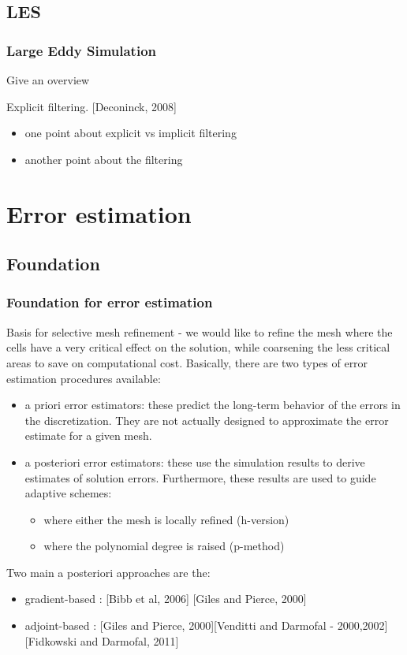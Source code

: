 \documentclass{beamer}
\begin{document}
\subsection{LES}
\begin{frame}
\frametitle{Large Eddy Simulation}
\scriptsize

Give an overview

Explicit filtering. [Deconinck, 2008]
\begin{itemize}
\item one point about explicit vs implicit filtering
\item another point about the filtering
\end{itemize}
\end{frame}


\section[Error estimates]{Error estimation}

\subsection{Foundation}
\begin{frame}
\frametitle{Foundation for error estimation}
\scriptsize
Basis for selective mesh refinement - we would like to refine the mesh where the cells have a very critical effect on the solution, while coarsening the less critical areas to save on computational cost.\newline 
Basically, there are two types of error estimation procedures available:
\begin{itemize}
\item a priori error estimators:  these predict the long-term behavior of the errors in the discretization. They are not actually designed to approximate the error estimate for a given mesh. 
\item a posteriori error estimators: these use the simulation results to derive estimates of solution errors. Furthermore, these results are used to guide adaptive schemes:
\begin{itemize}
\scriptsize
\item where either the mesh is locally refined (h-version) 
\item where the polynomial degree is raised (p-method)
\end{itemize}
\end{itemize}
Two main a posteriori approaches are the:
\begin{itemize}
\item gradient-based : [Bibb et al, 2006] [Giles and Pierce, 2000]
\item adjoint-based : [Giles and Pierce, 2000][Venditti and Darmofal - 2000,2002][Fidkowski and Darmofal, 2011] 
\end{itemize}
\end{frame}
\end{document}
